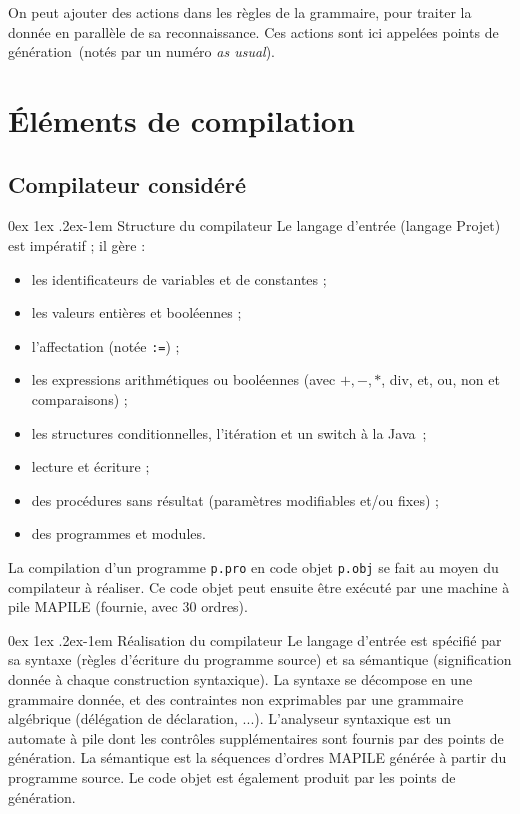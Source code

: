 \documentclass[a4paper]{article}
\makeatletter
\renewcommand{\paragraph}{%
  \@startsection{paragraph}{4}%
  {\z@}{0ex \@plus 1ex \@minus .2ex}{-1em}%
  {\normalfont\normalsize\bfseries}%
}
\makeatother
\begin{document}
On peut ajouter des actions dans les règles de la grammaire, pour traiter la donnée en parallèle de sa reconnaissance. Ces actions sont ici appelées \og points de génération\fg\ (notés par un numéro \textit{as usual}).

\section{\'Eléments de compilation}

\subsection{Compilateur considéré}

\paragraph{Structure du compilateur} Le langage d'entrée (langage Projet) est impératif ; il gère :\begin{itemize}
\item les identificateurs de variables et de constantes ;
\item les valeurs entières et booléennes ;
\item l'affectation (notée \verb?:=?) ;
\item les expressions arithmétiques ou booléennes (avec $+, -, *$, div, et, ou, non et comparaisons) ;
\item les structures conditionnelles, l'itération et un switch \og à la Java\fg\ ;
\item lecture et écriture ;
\item des procédures sans résultat (paramètres modifiables et/ou fixes) ;
\item des programmes et modules. \end{itemize}
La compilation d'un programme \verb?p.pro? en code objet \verb?p.obj? se fait au moyen du compilateur à réaliser. Ce code objet peut ensuite être exécuté par une machine à pile MAPILE (fournie, avec 30 ordres).

\paragraph{Réalisation du compilateur} Le langage d'entrée est spécifié par sa syntaxe (règles d'écriture du programme source) et sa sémantique (signification donnée à chaque construction syntaxique). La syntaxe se décompose en une grammaire donnée, et des contraintes non exprimables par une grammaire algébrique (délégation de déclaration, ...). L'analyseur syntaxique est un automate à pile dont les contrôles supplémentaires sont fournis par des points de génération. La sémantique est la séquences d'ordres MAPILE générée à partir du programme source. Le code objet est également produit par les points de génération.
\end{document}
